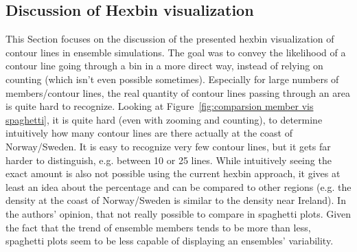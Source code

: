 
\subsection{Discussion of Hexbin visualization}


This Section focuses on the discussion of the presented hexbin visualization of contour lines in ensemble simulations. 
The goal was to convey the likelihood of a contour line going through a bin in a more direct way, instead of relying on counting (which isn't even possible sometimes). 
Especially for large numbers of members/contour lines, the real quantity of contour lines passing through an area is quite hard to recognize. 
Looking at Figure~\ref{fig:comparsion member vis spaghetti}, it is quite hard (even with zooming and counting), to determine intuitively how many contour lines are there actually at the coast of Norway/Sweden. 
It is easy to recognize very few contour lines, but it gets far harder to distinguish, e.g. between 10 or 25 lines. 
While intuitively seeing the exact amount is also not possible using the current hexbin approach, it gives at least an idea about the percentage and can be compared to other regions (e.g. the density at the coast of Norway/Sweden is similar to the density near Ireland). 
In the authors' opinion, that not really possible to compare in spaghetti plots. 
Given the fact that the trend of ensemble members tends to be more than less, spaghetti plots seem to be less capable of displaying an ensembles' variability. 


